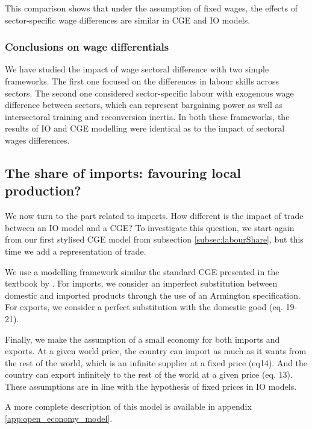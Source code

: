 This comparison shows that under the assumption of fixed wages, the effects of sector-specific wage differences are similar in CGE and IO models. 

\subsubsection{Conclusions on wage differentials}
We have studied the impact of wage sectoral difference with two simple frameworks. 
The first one focused on the differences in labour skills across sectors. 
The second one considered sector-specific labour with exogenous wage difference between sectors, which can represent bargaining power as well as intersectoral training and reconversion inertia.
In both these frameworks, the results of IO and CGE modelling were identical as to the impact of sectoral wages differences. 


\subsection{The share of imports: favouring local production?} \label{subec:importShare}
We now turn to the part related to imports. How different is the impact of trade between an IO model and a CGE?
To investigate this question, we start again from our first stylised CGE model from subsection \ref{subsec:labourShare}, but this time we add a representation of trade.

We use a modelling framework similar the standard CGE presented in the textbook by \citet{Hosoe2010}. For imports, we consider an imperfect substitution between domestic and imported products through the use of an Armington specification. For exports, we consider a perfect substitution with the domestic good
(eq. 19-21). 

Finally, we make the assumption of a small economy for both imports and exports. At a given world price, the country can import as much as it wants from the rest of the world, which is an infinite supplier at a fixed price (eq14). And the country can export infinitely to the rest of the world at a given price (eq. 13). These assumptions are in line with the hypothesis of fixed prices in IO models.

A more complete description of this model is available in appendix \ref{app:open_economy_model}.

